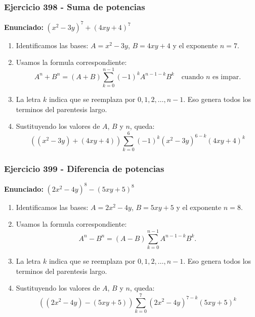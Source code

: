 \documentclass[11pt,a4paper]{article}
\begin{document}
\subsubsection*{Ejercicio 398 - Suma de potencias}
\textbf{Enunciado:} $ \left(x^{2} - 3 y\right)^{7}+\left(4 x y + 4\right)^{7} $\par
\begin{enumerate}[leftmargin=2em]
\item Identificamos las bases: \(A=x^{2} - 3 y\), \(B=4 x y + 4\) y el exponente \(n=7\).
\item Usamos la formula correspondiente: \[A^n+B^n=(A+B)\sum_{k=0}^{n-1}(-1)^kA^{n-1-k}B^k\quad\text{cuando }n\text{ es impar}.\]
\item La letra \(k\) indica que se reemplaza por \(0,1,2,\ldots,n-1\). Eso genera todos los terminos del parentesis largo.
\item Sustituyendo los valores de \(A\), \(B\) y \(n\), queda: \[\boxed{\left(\left(x^{2} - 3 y\right)+\left(4 x y + 4\right)\right)\sum_{k=0}^{6}(-1)^k\left(x^{2} - 3 y\right)^{6-k}\left(4 x y + 4\right)^k}\]
\end{enumerate}

\vspace{0.2cm}
\subsubsection*{Ejercicio 399 - Diferencia de potencias}
\textbf{Enunciado:} $ \left(2 x^{2} - 4 y\right)^{8}-\left(5 x y + 5\right)^{8} $\par
\begin{enumerate}[leftmargin=2em]
\item Identificamos las bases: \(A=2 x^{2} - 4 y\), \(B=5 x y + 5\) y el exponente \(n=8\).
\item Usamos la formula correspondiente: \[A^n-B^n=(A-B)\sum_{k=0}^{n-1}A^{n-1-k}B^k.\]
\item La letra \(k\) indica que se reemplaza por \(0,1,2,\ldots,n-1\). Eso genera todos los terminos del parentesis largo.
\item Sustituyendo los valores de \(A\), \(B\) y \(n\), queda: \[\boxed{\left(\left(2 x^{2} - 4 y\right)-\left(5 x y + 5\right)\right)\sum_{k=0}^{7}\left(2 x^{2} - 4 y\right)^{7-k}\left(5 x y + 5\right)^k}\]
\end{enumerate}

\vspace{0.2cm}
\end{document}
